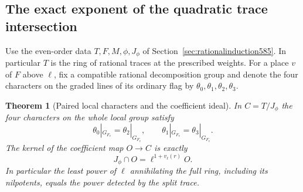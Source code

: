 \documentclass[a4paper,11pt]{article}
\newtheorem{theorem}[proposition]{Theorem}
\theoremstyle{definition}
\theoremstyle{remark}
\numberwithin{equation}{section}
\begin{document}
\subsection{The exact exponent of the quadratic trace intersection}
\label{sec:quadraticexponent587}

Use the even-order data \(T,F,M,\phi,J_\phi\) of
Section~\ref{sec:rationalinduction585}. In particular \(T\)
is the ring of rational traces at the prescribed weights.
For a place \(v\) of \(F\) above \(\ell\), fix a compatible
rational decomposition group and denote the four characters
on the graded lines of its ordinary flag by
\(\theta_0,\theta_1,\theta_2,\theta_3\).

\begin{theorem}[Paired local characters and the coefficient ideal]
\leavevmode\label{thm:quadraticexponent587}
In \(C=T/J_\phi\) the four characters on the whole local group
satisfy
\[
      \theta_0|_{G_{F_v}}=\theta_2|_{G_{F_v}},\qquad
      \theta_1|_{G_{F_v}}=\theta_3|_{G_{F_v}} .
\]
The kernel of the coefficient map \(O\to C\) is exactly
\[
                       J_\phi\cap O=\ell^{1+v_\ell(r)}O .
\]
In particular the least power of \(\ell\) annihilating the
full ring, including its nilpotents, equals the power detected
by the split trace.
\end{theorem}
\end{document}
